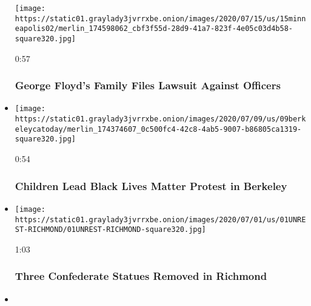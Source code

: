 \begin{itemize}
  \texttt{[image: https://static01.graylady3jvrrxbe.onion/images/2020/07/15/us/15minneapolis02/merlin\_174598062\_cbf3f55d-28d9-41a7-823f-4e05c03d4b58-square320.jpg]}

  0:57

  \hypertarget{george-floyds-family-files-lawsuit-against-officers}{%
  \subsubsection{George Floyd's Family Files Lawsuit Against
  Officers}\label{george-floyds-family-files-lawsuit-against-officers}}
\item
  \href{https://www.nytimes3xbfgragh.onion/video/us/100000007231853/children-lead-black-lives-matter-protest-in-berkeley.html?action=click\&module=video-series-bar\&region=header\&pgtype=Article\&playlistId=video/minneapolis-george-floyd-death-video}{}

  \texttt{[image: https://static01.graylady3jvrrxbe.onion/images/2020/07/09/us/09berkeleycatoday/merlin\_174374607\_0c500fc4-42c8-4ab5-9007-b86805ca1319-square320.jpg]}

  0:54

  \hypertarget{children-lead-black-lives-matter-protest-in-berkeley}{%
  \subsubsection{Children Lead Black Lives Matter Protest in
  Berkeley}\label{children-lead-black-lives-matter-protest-in-berkeley}}
\item
  \href{https://www.nytimes3xbfgragh.onion/video/us/100000007227431/confederate-statues-removed-richmond.html?action=click\&module=video-series-bar\&region=header\&pgtype=Article\&playlistId=video/minneapolis-george-floyd-death-video}{}

  \texttt{[image: https://static01.graylady3jvrrxbe.onion/images/2020/07/01/us/01UNREST-RICHMOND/01UNREST-RICHMOND-square320.jpg]}

  1:03

  \hypertarget{three-confederate-statues-removed-in-richmond}{%
  \subsubsection{Three Confederate Statues Removed in
  Richmond}\label{three-confederate-statues-removed-in-richmond}}
\item
  \href{https://www.nytimes3xbfgragh.onion/video/us/politics/100000007220241/richmond-confederate-monument-taken-down.html?action=click\&module=video-series-bar\&region=header\&pgtype=Article\&playlistId=video/minneapolis-george-floyd-death-video}{}


\end{itemize}
